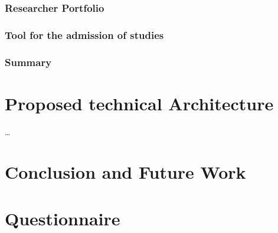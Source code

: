 \documentclass{article}
\begin{document}
\subsubsection{Researcher Portfolio}

\subsubsection{Tool for the admission of studies}

\subsubsection{Summary}



\section{Proposed technical Architecture}
\ldots

\section{Conclusion and Future Work}

\newpage



\newpage
\appendix
\section{Questionnaire}

\end{document}
